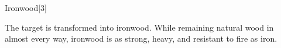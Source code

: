 \begin{spellsection}{Ironwood}[3]

\begin{spellcontent}

\begin{spelltargetinginfo}



\end{spelltargetinginfo}


\begin{spelleffects}



\spelleffect
The target is transformed into ironwood.
While remaining natural wood in almost every way, ironwood is as strong, heavy, and resistant to fire as iron.








\end{spelleffects}

\end{spellcontent}
\begin{spellfooter}


\end{spellfooter}
\begin{spellsubcontent}


\end{spellsubcontent}
\end{spellsection}


